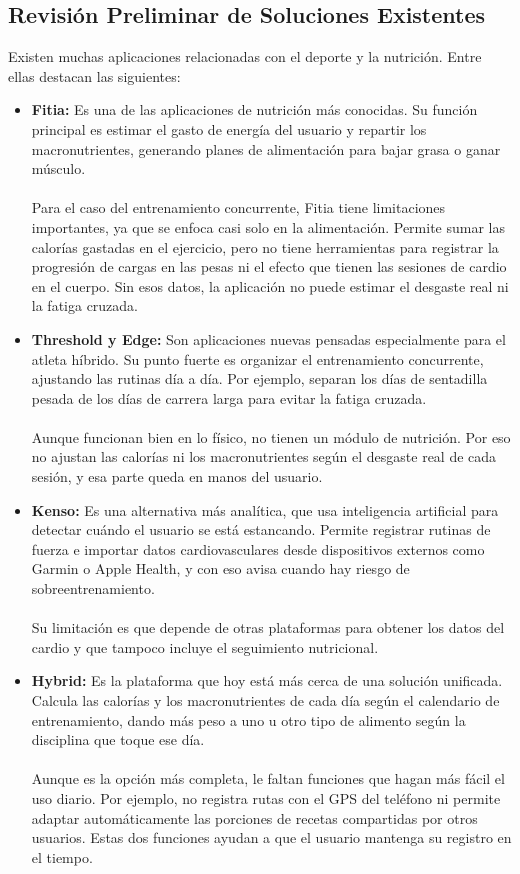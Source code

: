 \subsection{Revisión Preliminar de Soluciones Existentes}
Existen muchas aplicaciones relacionadas con el deporte y la nutrición. Entre ellas destacan las siguientes:
\begin{itemize}
    \item \textbf{Fitia:} Es una de las aplicaciones de nutrición más conocidas. Su función principal es estimar el gasto de energía del usuario y repartir los macronutrientes, generando planes de alimentación para bajar grasa o ganar músculo.
    \\\\
    Para el caso del entrenamiento concurrente, Fitia tiene limitaciones importantes, ya que se enfoca casi solo en la alimentación. Permite sumar las calorías gastadas en el ejercicio, pero no tiene herramientas para registrar la progresión de cargas en las pesas ni el efecto que tienen las sesiones de cardio en el cuerpo. Sin esos datos, la aplicación no puede estimar el desgaste real ni la fatiga cruzada.

    \item \textbf{Threshold y Edge:} Son aplicaciones nuevas pensadas especialmente para el atleta híbrido. Su punto fuerte es organizar el entrenamiento concurrente, ajustando las rutinas día a día. Por ejemplo, separan los días de sentadilla pesada de los días de carrera larga para evitar la fatiga cruzada.
    \\\\
    Aunque funcionan bien en lo físico, no tienen un módulo de nutrición. Por eso no ajustan las calorías ni los macronutrientes según el desgaste real de cada sesión, y esa parte queda en manos del usuario.

    \item \textbf{Kenso:} Es una alternativa más analítica, que usa inteligencia artificial para detectar cuándo el usuario se está estancando. Permite registrar rutinas de fuerza e importar datos cardiovasculares desde dispositivos externos como Garmin o Apple Health, y con eso avisa cuando hay riesgo de sobreentrenamiento.
    \\\\
    Su limitación es que depende de otras plataformas para obtener los datos del cardio y que tampoco incluye el seguimiento nutricional.
    \item \textbf{Hybrid:} Es la plataforma que hoy está más cerca de una solución unificada. Calcula las calorías y los macronutrientes de cada día según el calendario de entrenamiento, dando más peso a uno u otro tipo de alimento según la disciplina que toque ese día.
    \\\\
    Aunque es la opción más completa, le faltan funciones que hagan más fácil el uso diario. Por ejemplo, no registra rutas con el GPS del teléfono ni permite adaptar automáticamente las porciones de recetas compartidas por otros usuarios. Estas dos funciones ayudan a que el usuario mantenga su registro en el tiempo.
\end{itemize}

